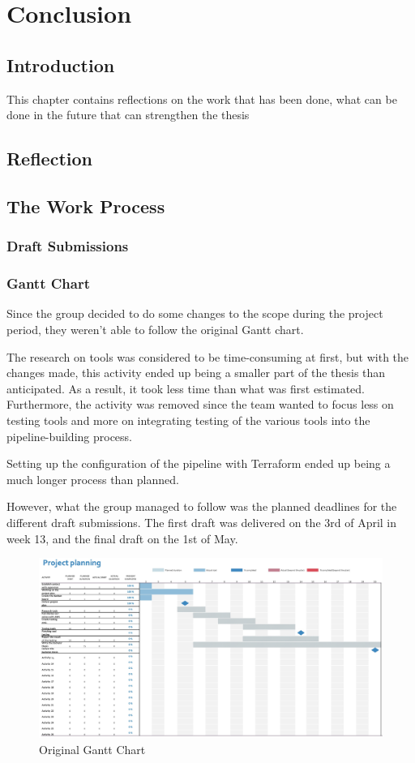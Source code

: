 \chapter{Conclusion}
\section{Introduction}
This chapter contains reflections on the work that has been done, what can be done in the future that can strengthen the thesis

\section{Reflection}


\section{The Work Process}

\subsection{Draft Submissions}


\subsection{Gantt Chart}
Since the group decided to do some changes to the scope during the project period, they weren't able to follow the original Gantt chart. 

The research on tools was considered to be time-consuming at first, but with the changes made, this activity ended up being a smaller part of the thesis than anticipated. As a result, it took less time than what was first estimated. Furthermore, the activity was removed since the team wanted to focus less on testing tools and more on integrating testing of the various tools into the pipeline-building process. 

Setting up the configuration of the pipeline with Terraform  ended up being a much longer process than planned. 

However, what the group managed to follow was the planned deadlines for the different draft submissions. The first draft was delivered on the 3rd of April in week 13, and the final draft on the 1st of May.

\vspace{2mm}
\begin{figure}[H]
    \centering
    \includegraphics[width=0.8\columnwidth]{Images/gantt2.jpg}
    \caption{Original Gantt Chart}
    \label{fig: Original Gantt Chart}
\end{figure}

